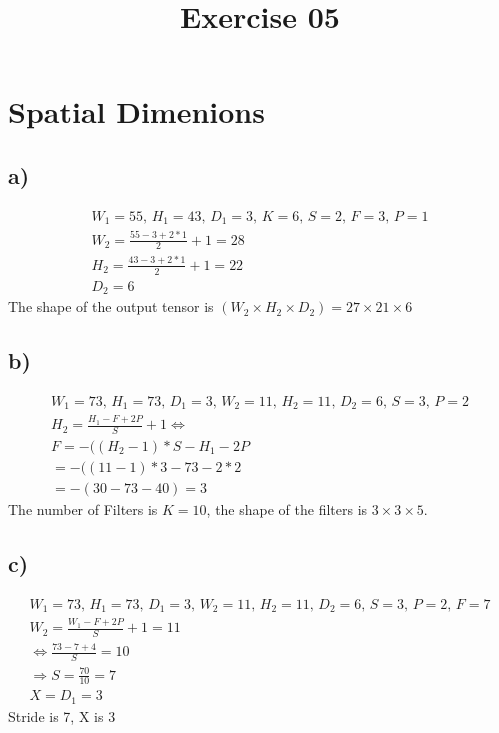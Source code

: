 \documentclass[]{article}
\begin{document}
\title{Exercise 05}
\maketitle
\section{Spatial Dimenions}
\subsection*{a)}
\begin{align*}
W_1 = 55,\, H_1 = 43,\, D_1 = 3,\, K = 6,\, S = 2,\, F  = 3,\, P = 1 \\
W_2 = \frac{55 - 3 + 2*1}{2} + 1 = 28 \\
H_2 = \frac{43 - 3 + 2*1}{2} + 1 = 22 \\
D_2 = 6
\end{align*}
The shape of the output tensor is $(W_2 \times H_2 \times D_2) = 27 \times 21 \times 6$

\subsection*{b)}
\begin{align*}
W_1 = 73,\, H_1 = 73,\, D_1 =3 ,\, W_2 = 11,\, H_2 = 11,\, D_2 = 6,\, S = 3,\,P = 2\\
H_2 = \frac{H_1 - F + 2P}{S} + 1 \Leftrightarrow \\
F = -((H_2 - 1) * S - H_1 - 2P \\
= -((11 - 1) * 3 - 73 - 2*2 \\
= -(30 - 73 - 40) = 3
\end{align*}
The number of Filters is $K = 10$, the shape of the filters is $3 \times 3 \times 5$.

\subsection*{c)}
\begin{align*}
W_1 = 73,\, H_1 = 73,\, D_1 =3 ,\, W_2 = 11,\, H_2 = 11,\, D_2 = 6,\, S = 3,\,P = 2,\, F = 7\\
W_2 = \frac{W_1 - F + 2P}{S} + 1 = 11 \\
\Leftrightarrow \frac{73 - 7 + 4}{S} = 10 \\
\Rightarrow S = \frac{70}{10} = 7 \\
X = D_1 = 3 
\end{align*}
Stride is 7, X is 3
\end{document}

